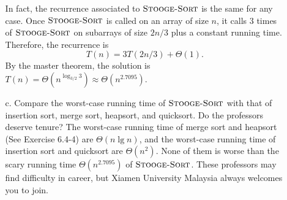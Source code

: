 \documentclass[12pt,reqno]{amsart}
\newif\ifanswer
\begin{document}
\begin{enumerate}[1.]
\begin{enumerate}
    In fact, the recurrence associated to $\textsc{Stooge-Sort}$ is the same for any case. Once $\textsc{Stooge-Sort}$ is called on an array of size $n$, it calls $3$ times of $\textsc{Stooge-Sort}$ on subarrays of size $2n/3$ plus a constant running time. Therefore, the recurrence is
    $$
    T(n) = 3T(2n/3) + \Theta(1).
    $$
    By the master theorem, the solution is $T(n) = \Theta(n^{\log_{3/2}{3}}) \approx \Theta(n^{2.7095})$.
    \item[c.] Compare the worst-case running time of $\textsc{Stooge-Sort}$ with that of insertion sort, merge sort, heapsort, and quicksort. Do the professors deserve tenure?
    \ifanswer
    \noindent {\bf \\Solution}
    The worst-case running time of merge sort and heapsort (See Exercise 6.4-4) are $\Theta(n\lg{n})$, and the worst-case running time of insertion sort and quicksort are $\Theta(n^2)$. None of them is worse than the scary running time $\Theta(n^{2.7095})$ of $\textsc{Stooge-Sort}$. These professors may find difficulty in career, but Xiamen University Malaysia always welcomes you to join.
\end{enumerate}
\vspace{1cm}



\end{enumerate}
\end{document}
